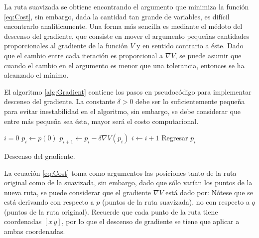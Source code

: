 
La ruta suavizada se obtiene encontrando el argumento que minimiza la función \ref{eq:Cost}, sin embargo, dada la cantidad tan grande de variables, es difícil encontrarlo analíticamente. Una forma más sencilla es mediante el médoto del descenso del gradiente, que consiste en mover el argumento pequeñas cantidades proporcionales al gradiente de la función $V$ y en sentido contrario a éste. Dado que el cambio entre cada iteración es proporcional a $\nabla V$, se puede asumir que cuando el cambio en el argumento es menor que una tolerancia, entonces se ha alcanzado el mínimo. 

El algoritmo \ref{alg:Gradient} contiene los pasos en pseudocódigo para implementar descenso del gradiente. La constante $\delta > 0$ debe ser lo suficientemente pequeña para evitar inestabilidad en el algoritmo, sin embargo, se debe considerar que entre más pequeña sea ésta, mayor será el costo computacional. 

\begin{algorithm}
	\DontPrintSemicolon
	$i = 0$\;
	$p_i \leftarrow p(0)$\;
	{
		\BlankLine
		$p_{i+1} \leftarrow p_i - \delta\nabla V(p_i)$\;
		$i \leftarrow i+1$
		\BlankLine
	}
	Regresar $p_i$
	\caption{Descenso del gradiente.}
	\label{alg:Gradient}
\end{algorithm}

La ecuación \ref{eq:Cost} toma como argumentos las posiciones tanto de la ruta original como de la suavizada, sin embargo, dado que sólo varían los puntos de la nueva ruta, se puede considerar que el gradiente $\nabla V$ está dado por:
Nótese que se está derivando con respecto a $p$ (puntos de la ruta suavizada), no con respecto a $q$ (puntos de la ruta original). Recuerde que cada punto de la ruta tiene coordenadas $[x\,y]$, por lo que el descenso de gradiente se tiene que aplicar a ambas coordenadas. 

